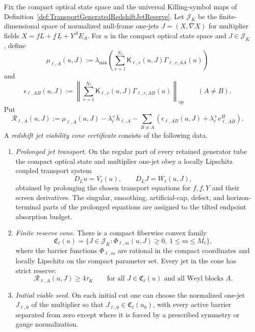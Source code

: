 \begin{definition}\label{def:RedshiftJetViabilityConeCertificate}
Fix the compact optical state space and the universal Killing-symbol maps of
Definition~\ref{def:TransportGeneratedRedshiftJetReserve}.  Let
$\mathcal J_K$ be the finite-dimensional space of normalized null-frame one-jets
$J=(X,\nabla X)$ for multiplier fields
$X=fL+\underline f\,\underline L+Y^AE_A$.  For $u$ in the compact optical state
space and $J\in\mathcal J_K$, define
\[
    \mu_{\ell,A}(u,J)
    :=
    \lambda_{\min}
    \left(
    \sum_{r=1}^{N_*}\mathsf K_{\ell,r}(u,J)\Gamma_{\ell,r,AA}(u)
    \right)
\]
and
\[
    \epsilon_{\ell,AB}(u,J)
    :=
    \left\|
    \sum_{r=1}^{N_*}\mathsf K_{\ell,r}(u,J)\Gamma_{\ell,r,AB}(u)
    \right\|_{\mathrm{op}}
    \qquad(A\ne B).
\]
Put
\[
    \mathcal R_{\ell,A}(u,J)
    :=
    \mu_{\ell,A}(u,J)
    -
    \lambda_\ell^+\overline h_{\ell,A}
    -
    \sum_{B\ne A}
    \left(
        \epsilon_{\ell,AB}(u,J)+\lambda_\ell^+e^H_{\ell,AB}
    \right).
\]
A \emph{redshift jet viability cone certificate} consists of the following
data.
\begin{enumerate}
    \item \emph{Prolonged jet transport.}  On the regular part of every retained
    generator tube the compact optical state and multiplier one-jet obey a
    locally Lipschitz coupled transport system
    \[
        D_Lu=V_\ell(u),
        \qquad
        D_LJ=W_\ell(u,J),
    \]
    obtained by prolonging the chosen transport equations for
    $f,\underline f,Y$ and their screen derivatives.  The singular,
    smoothing, artificial-cap, defect, and horizon-terminal parts of the
    prolonged equations are assigned to the tilted endpoint absorption budget.

    \item \emph{Finite reserve cone.}  There is a compact fiberwise convex
    family
    \[
        \mathfrak C_\ell(u)
        =
        \{J\in\mathcal J_K:\Phi_{\ell,m}(u,J)\ge0,\ 1\le m\le M_\ell\},
    \]
    where the barrier functions $\Phi_{\ell,m}$ are rational in the compact
    coordinates and locally Lipschitz on the compact parameter set.
    Every jet in the cone has strict reserve:
    \[
        \mathcal R_{\ell,A}(u,J)\ge4\tau_K
        \qquad
        \text{for all }J\in\mathfrak C_\ell(u)
        \text{ and all Weyl blocks }A .
    \]

    \item \emph{Initial viable seed.}  On each initial cut one can choose the
    normalized one-jet $J_{\ell,0}$ of the multiplier so that
    $J_{\ell,0}\in\mathfrak C_\ell(u_0)$, with every active barrier separated
    from zero except where it is forced by a prescribed symmetry or gauge
    normalization.


\end{enumerate}
\end{definition}

